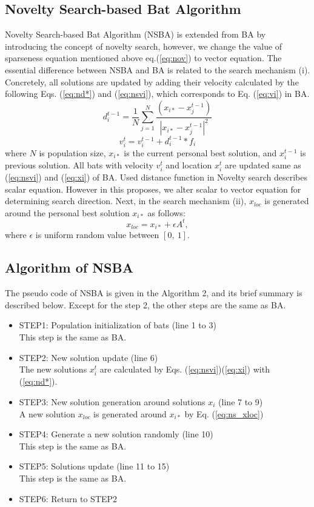 \documentclass{ies2018}
\begin{document}
\subsection{Novelty Search-based Bat Algorithm}
Novelty Search-based Bat Algorithm (NSBA) is extended from BA by introducing the concept of novelty search, however, we change the value of sparseness equation mentioned above eq.(\ref{eq:nov}) to vector equation. The essential difference between NSBA and BA is related to the search mechanism (i). Concretely, all solutions are updated by adding their velocity calculated by the following Eqs. (\ref{eq:nd*}) and (\ref{eq:nsvi}), which corresponds to Eq. (\ref{eq:vi}) in BA. 
\begin{equation}
d_i^{t-1} = \frac {1}{N} \sum _{j=1}^N \frac {(x_{i*}-x_j^{t-1})}{|x_{i*}-x_j^{t-1}|^2}
\label{eq:nd*}
\end{equation}
\begin{equation}
v_i^t=v_i^{t-1}+d_i^{t-1}*f_i
\label{eq:nsvi}
\end{equation}
where ${N}$ is population size, ${x_{i*}}$ is the current personal best solution, and ${x_i^{t-1}}$ is previous solution. All bats with velocity ${v_i^t}$ and location ${x_i^t}$ are updated same as (\ref{eq:nsvi}) and (\ref{eq:xi}) of BA. Used distance function in Novelty search describes scalar equation. However in this proposes, we alter scalar to vector equation for determining search direction. 
Next, in the search mechanism (ii), $x_{loc}$ is generated around the personal best solution $x_{i*}$ as follows:
\begin{equation}
x_{loc}=x_{i*}+ \epsilon A^t,
\label{eq:ns_xloc}
\end{equation}
where $\epsilon$ is uniform random value between $[0, \ 1]$.
 \subsection{Algorithm of NSBA} 
 The pseudo code of NSBA is given in the Algorithm 2, and its brief summary is described below. Except for the step 2, the other steps are the same as BA.

\begin{itemize}
\item STEP1: Population initialization of bats (line 1 to 3)\\
This step is the same as BA.
\item STEP2: New solution update (line 6)\\
The new solutions ${x_i^t}$ are calculated by Eqs. (\ref{eq:nsvi})(\ref{eq:xi}) with (\ref{eq:nd*}).
\item STEP3: New solution generation around solutions ${x_i}$ (line 7 to 9)\\
 A new solution ${x_{loc}}$ is generated around $x_{i*}$ by Eq. (\ref{eq:ns_xloc})
\item STEP4: Generate a new solution randomly (line 10)\\
This step is the same as BA.
\item STEP5: Solutions update (line 11 to 15)\\
This step is the same as BA.
\item STEP6: Return to STEP2
\end{itemize}
\end{document}
